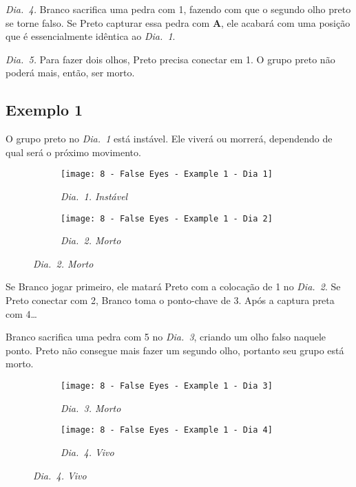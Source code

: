 \emph{Dia.\@~4.} Branco sacrifica uma pedra com 1, fazendo com que o segundo olho preto se torne falso. Se Preto capturar essa pedra com \textbf{A}, ele acabará com uma posição que é essencialmente idêntica ao \emph{Dia.\@~1}.

\emph{Dia.\@~5.} Para fazer dois olhos, Preto precisa conectar em 1. O grupo preto não poderá mais, então, ser morto.

\pagebreak

\subsection{Exemplo 1}

O grupo preto no \emph{Dia.\@~1} está instável. Ele viverá ou morrerá, dependendo de qual será o próximo movimento.

\begin{figure}[h!]
    \centering
    \begin{subfigure}[t]{.31\textwidth}
        \texttt{[image: 8 - False Eyes - Example 1 - Dia 1]}
        \captionsetup{justification=centering}
        \caption*{\emph{Dia.\@~1. Instável}}
    \end{subfigure}
    \hspace{1cm}
    \begin{subfigure}[t]{.31\textwidth}
        \texttt{[image: 8 - False Eyes - Example 1 - Dia 2]}
        \captionsetup{justification=centering}
        \caption*{\emph{Dia.\@~2. Morto}}
    \end{subfigure}
\end{figure}

Se Branco jogar primeiro, ele matará Preto com a colocação de 1 no \emph{Dia.\@~2}. Se Preto conectar com 2, Branco toma o ponto-chave de 3. Após a captura preta com 4\ldots

Branco sacrifica uma pedra com 5 no \emph{Dia.\@~3}, criando um olho falso naquele ponto. Preto não consegue mais fazer um segundo olho, portanto seu grupo está morto.

\begin{figure}[h!]
    \centering
    \begin{subfigure}[t]{.31\textwidth}
        \texttt{[image: 8 - False Eyes - Example 1 - Dia 3]}
        \captionsetup{justification=centering}
        \caption*{\emph{Dia.\@~3. Morto}}
    \end{subfigure}
    \hspace{1cm}
    \begin{subfigure}[t]{.31\textwidth}
        \texttt{[image: 8 - False Eyes - Example 1 - Dia 4]}
        \captionsetup{justification=centering}
        \caption*{\emph{Dia.\@~4. Vivo}}
    \end{subfigure}
\end{figure}

